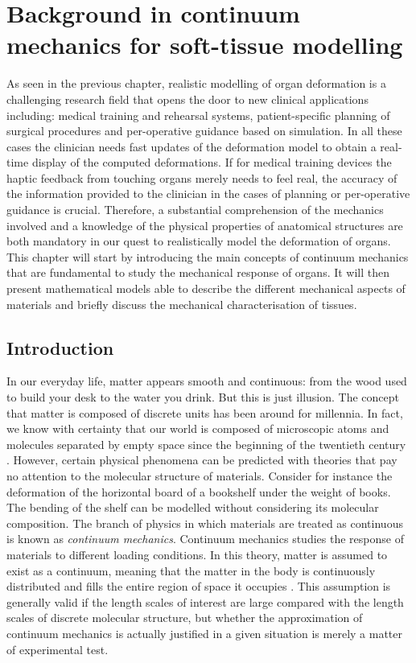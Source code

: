 \chapter{Background in continuum mechanics for soft-tissue modelling}
\label{chap2}
\begin{shortAbstract}
As seen in the previous chapter, realistic modelling of organ deformation is a challenging research field that opens the door to new clinical applications including: medical training and rehearsal systems, patient-specific planning of surgical procedures and per-operative guidance based on simulation. In all these cases the clinician needs fast updates of the deformation model to obtain a real-time display of the computed deformations. If for medical training devices the haptic feedback from touching organs merely needs to feel real, the accuracy of the information provided to the clinician in the cases of planning or per-operative guidance is crucial. Therefore, a substantial comprehension of the mechanics involved and a knowledge of the physical properties of anatomical structures are both mandatory in our quest to realistically model the deformation of organs. This chapter will start by introducing the main concepts of continuum mechanics that are fundamental to study the mechanical response of organs. It will then present mathematical models able to describe the different mechanical aspects of materials and briefly discuss the mechanical characterisation of tissues.
\end{shortAbstract}



\section{Introduction}
In our everyday life, matter appears smooth and continuous: from the wood used to build your desk to the water you drink. But this is just illusion. The concept that matter is composed of discrete units has been around for millennia. In fact, we know with certainty that our world is composed of microscopic atoms and molecules separated by empty space since the beginning of the twentieth century \citep{Lautrup05}. However, certain physical phenomena can be predicted with theories that pay no attention to the molecular structure of materials. Consider for instance the deformation of the horizontal board of a bookshelf under the weight of books. The bending of the shelf can be modelled without considering its molecular composition. The branch of physics in which materials are treated as continuous is known as \emph{continuum mechanics}. Continuum mechanics studies the response of materials to different loading conditions. In this theory, matter is assumed to exist as a continuum, meaning that the matter in the body is continuously distributed and fills the entire region of space it occupies \citep{Lai96}. This assumption is generally valid if the length scales of interest are large compared with the length scales of discrete molecular structure, but whether the approximation of continuum mechanics is actually justified in a given situation is merely a matter of experimental test. 

